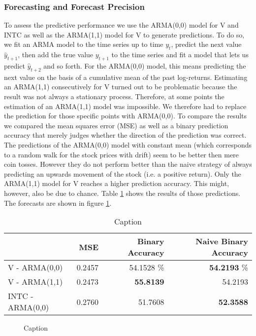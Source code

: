 \subsubsection{Forecasting and Forecast Precision}
To assess the predictive performance we use the ARMA(0,0) model for V and INTC as well as the ARMA(1,1) model for V to generate predictions. To do so, we fit an ARMA model to the time series up to time $y_t$, predict the next value $\hat{y}_{t+1}$, then add the true value $y_{t+1}$ to the time series and fit a model that lets us predict $\hat{y}_{t + 2}$ and so forth. For the ARMA(0,0) model, this means predicting the next value on the basis of a cumulative mean of the past log-returns. Estimating an ARMA(1,1) consecutively for V turned out to be problematic because the result was not always a stationary process. Therefore, at some points the estimation of an ARMA(1,1) model was impossible. We therefore had to replace the prediction for those specific points with ARMA(0,0). 
To compare the results we compared the mean squares error (MSE) as well as a binary prediction accuracy that merely judges whether the direction of the prediction was correct. The predictions of the ARMA(0,0) model with constant mean (which corresponds to a random walk for the stock prices with drift) seem to be better then mere coin tosses. However they do not perform better than the naive strategy of always predicting an upwards movement of the stock (i.e. a positive return). Only the ARMA(1,1) model for V reaches a higher prediction accuracy. This might, however, also be due to chance. Table \ref{tab:V_INTC_ARMA_predictions} shows the results of those predictions. The forecasts are shown in figure \ref{fig:V_INTC_ARMA_predictions_plot}. 

\begin{table}[]
    \centering
    \begin{tabular}{lrrr}
    \toprule
    {}  & MSE & Binary Accuracy & Naive Binary Accuracy \\
    \midrule
    V - ARMA(0,0) & 0.2457 & 54.1528 \% & \textbf{54.2193} \% \\
    V - ARMA(1,1) & 0.2473 & \textbf{55.8139} & 54.2193 \\
    INTC - ARMA(0,0) & 0.2760 & 51.7608 & \textbf{52.3588} \\
    \bottomrule
    \end{tabular}
    \caption{Caption}
    \label{tab:V_INTC_ARMA_predictions}
\end{table}{}

\begin{figure}
    \centering
    \caption{Caption}
    \label{fig:V_INTC_ARMA_predictions_plot}
\end{figure}{}


